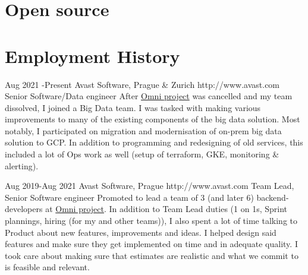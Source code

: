 \documentclass[10pt]{article} %
\begin{document}


    \section{Open source}



    \section{Employment History}

    \job
    {Aug 2021 -}{Present}
    {Avast Software, Prague \& Zurich}
    {http://www.avast.com}
    {Senior Software/Data engineer}
    {After \href{https://www.avast.com/en-us/omni}{Omni project} was cancelled and my team dissolved, I joined a Big Data team. I was tasked with making various improvements
    to many of the existing components of the big data solution. Most notably, I participated on migration and modernisation of on-prem big data solution to GCP. In addition to programming and redesigning of old services, this included a lot of Ops work as well (setup of terraform, GKE, monitoring \& alerting).\\

    }


    \job
    {Aug 2019-}{Aug 2021}
    {Avast Software, Prague}
    {http://www.avast.com}
    {Team Lead, Senior Software engineer}
    {Promoted to lead a team of 3 (and later 6) backend-developers at \href{https://www.avast.com/en-us/omni}{Omni project}. In addition to Team Lead duties (1 on 1s, Sprint plannings, hiring (for my and other teams)), I also spent a lot of time talking to Product about new features, improvements and ideas. I helped design said features and make sure they get implemented on time and in adequate quality. I took care about making sure that estimates are realistic and what we commit to is feasible and relevant. \\

    }
\end{document}
